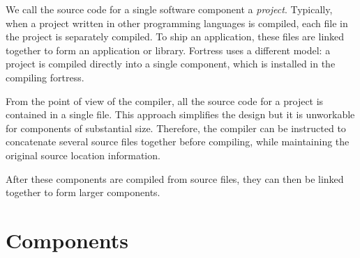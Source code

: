 %
%
%
%



We call the source code for a single software component a \emph{project}.
Typically, when a project written in other programming languages is compiled,
each file in the project is separately compiled.
To ship an application,
these files are linked together to form an application or library.
Fortress uses a different model:
a project is compiled directly into a single component,
which is installed in the compiling fortress.

From the point of view of the compiler, all the source code for a
project is contained in a single file.  This approach simplifies the design
but it is unworkable for
components of substantial size.  Therefore, the compiler can be
instructed to concatenate several source files together before
compiling, while maintaining the original source location
information.

After these components are compiled from source files, they can then
be linked together to form larger components.





\section{Components}



